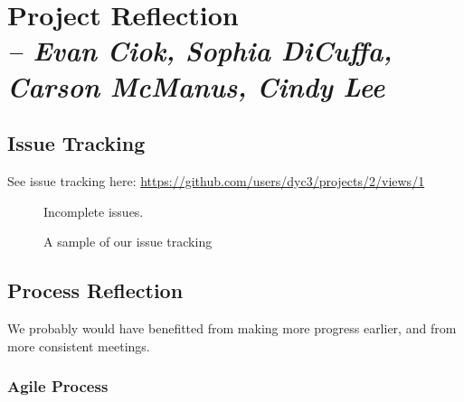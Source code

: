\chapter{Project Reflection \\
  \small{\textit{-- Evan Ciok, Sophia DiCuffa, Carson McManus, Cindy Lee}}
  \label{Chapter::ProjectReflection}}

\section{Issue Tracking}

See issue tracking here: \href{https://github.com/users/dyc3/projects/2/views/1}{https://github.com/users/dyc3/projects/2/views/1}

\begin{figure}
	\centering
	\caption{\label{Figure::gh-incomplete} Incomplete issues.}
\end{figure}

\begin{figure}
	\centering
	\caption{\label{Figure::gh-issue-sample.png} A sample of our issue tracking}
\end{figure}

\section{Process Reflection}

We probably would have benefitted from making more progress earlier, and from more consistent meetings.

\subsection{Agile Process}

